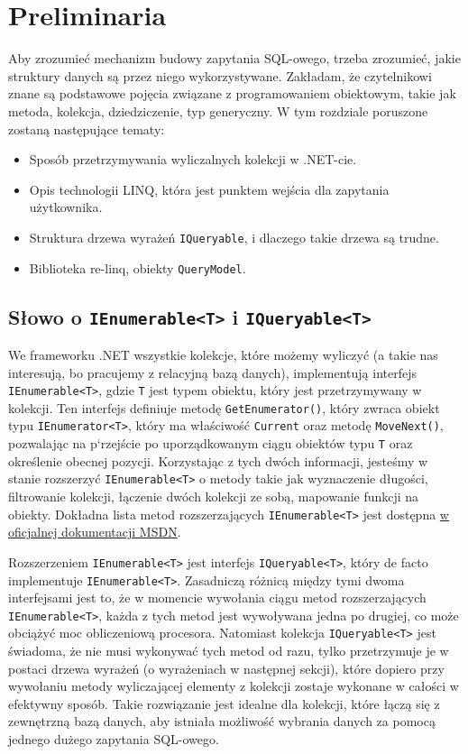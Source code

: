 \chapter{Preliminaria}
Aby zrozumieć mechanizm budowy zapytania SQL-owego, trzeba zrozumieć, jakie struktury danych są przez niego wykorzystywane. Zakładam, że czytelnikowi znane są podstawowe pojęcia związane z programowaniem obiektowym, takie jak metoda, kolekcja, dziedziczenie, typ generyczny. W tym rozdziale poruszone zostaną następujące tematy:

\begin{itemize}
\item Sposób przetrzymywania wyliczalnych kolekcji w .NET-cie.
\item Opis technologii LINQ, która jest punktem wejścia dla zapytania użytkownika. 
\item Struktura drzewa wyrażeń \texttt{IQueryable}, i dlaczego takie drzewa są trudne.
\item Biblioteka re-linq, obiekty \texttt{QueryModel}.
\end{itemize}

\section{Słowo o \texttt{IEnumerable<T>} i \texttt{IQueryable<T>}}
We frameworku .NET wszystkie kolekcje, które możemy wyliczyć (a takie nas interesują, bo pracujemy z relacyjną bazą danych), implementują interfejs \linebreak \texttt{IEnumerable<T>}, gdzie \texttt{T} jest typem obiektu, który jest przetrzymywany w kolekcji. Ten interfejs definiuje metodę \texttt{GetEnumerator()}, który zwraca obiekt typu \texttt{IEnumerator<T>}, który ma właściwość \texttt{Current} oraz metodę \texttt{MoveNext()}, pozwalając na p`rzejście po uporządkowanym ciągu obiektów typu \texttt{T} oraz określenie obecnej pozycji. Korzystając z tych dwóch informacji, jesteśmy w stanie rozszerzyć \texttt{IEnumerable<T>} o metody takie jak wyznaczenie długości, filtrowanie kolekcji, łączenie dwóch kolekcji ze sobą, mapowanie funkcji na obiekty. Dokładna lista metod rozszerzających \texttt{IEnumerable<T>} jest dostępna \href{https://msdn.microsoft.com/pl-pl/library/9eekhta0(v=vs.110).aspx}{w oficjalnej dokumentacji MSDN}.

Rozszerzeniem \texttt{IEnumerable<T>} jest interfejs \texttt{IQueryable<T>}, który de facto implementuje \texttt{IEnumerable<T>}. Zasadniczą różnicą między tymi dwoma interfejsami jest to, że w momencie wywołania ciągu metod rozszerzających \texttt{IEnumerable<T>}, każda z tych metod jest wywoływana jedna po drugiej, co może obciążyć moc obliczeniową procesora. Natomiast kolekcja \texttt{IQueryable<T>} jest świadoma, że nie musi wykonywać tych metod od razu, tylko przetrzymuje je w postaci drzewa wyrażeń (o wyrażeniach w następnej sekcji), które dopiero przy wywołaniu metody wyliczającej elementy z kolekcji zostaje wykonane w całości w efektywny sposób. Takie rozwiązanie jest idealne dla kolekcji, które łączą się z zewnętrzną bazą danych, aby istniała możliwość wybrania danych za pomocą jednego dużego zapytania SQL-owego.

